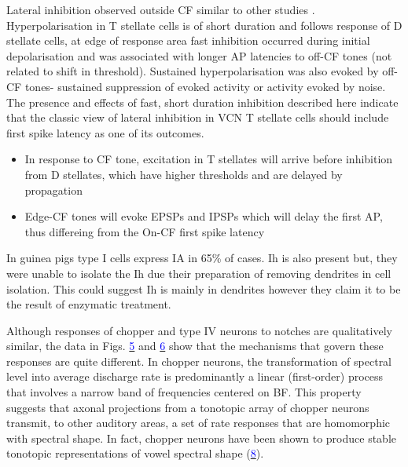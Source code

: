 \documentclass[10pt,a4paper]{article}
\newcommand\textstyleInternetlink[1]{\textcolor{blue}{#1}}
\begin{document}
Lateral inhibition observed outside CF similar to other studies
\citep{FerragamoGoldingEtAl:1998a,FujinoOertel:2001,RhodeGreenberg:1994b}. Hyperpolarisation
in T stellate cells is of short duration and follows response of D stellate
cells, at edge of response area fast inhibition occurred during initial
depolarisation and was associated with longer AP latencies to off-CF tones (not
related to shift in threshold).  Sustained hyperpolarisation was also evoked by
off-CF tones- sustained suppression of evoked activity or activity evoked by
noise.  The presence and effects of fast, short duration inhibition described
here indicate that the classic view of lateral inhibition in VCN T stellate
cells should include first spike latency as one of its outcomes.


\begin{itemize}
\item In response to CF tone, excitation in T stellates will arrive before
  inhibition from D stellates, which have higher thresholds and are delayed by
  propagation
\item Edge-CF tones will evoke EPSPs and IPSPs which will delay the first AP,
  thus differeing from the On-CF first spike latency
\end{itemize}
In guinea pigs \citep{RothmanManis:2003a} type I cells express IA in 65\% of
cases. Ih is also present but, they were unable to isolate the Ih due their
preparation of removing dendrites in cell isolation. This could suggest Ih is
mainly in dendrites however they claim it to be the result of enzymatic
treatment.

\citep{RhodeGreenberg:1994b}

\citep{YuYoung:2000}

Although responses of chopper and type IV neurons to notches are qualitatively
similar, the data in Figs.
\href{www.pnas.org/cgi/content/full/97/22/11780#F5}{\textstyleInternetlink{5}}
and
\href{www.pnas.org/cgi/content/full/97/22/11780#F6}{\textstyleInternetlink{6}}
show that the mechanisms that govern these responses are quite different. In
chopper neurons, the transformation of spectral level into average discharge
rate is predominantly a linear (first-order) process that involves a narrow band
of frequencies centered on BF. This property suggests that axonal projections
from a tonotopic array of chopper neurons transmit, to other auditory areas, a
set of rate responses that are homomorphic with spectral shape. In fact, chopper
neurons have been shown to produce stable tonotopic representations of vowel
spectral shape
(\href{www.pnas.org/cgi/content/full/97/22/11780#B8}{\textstyleInternetlink{8}}).
\end{document}
